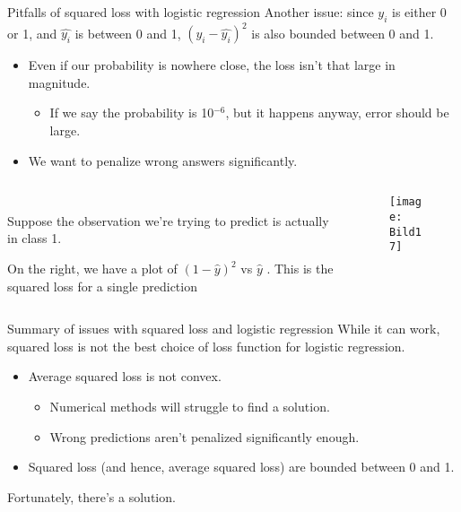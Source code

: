 \documentclass[aspectratio=169]{../latex_main/tntbeamer}  %
\begin{document}
	
	\begin{frame}{Pitfalls of squared loss with logistic regression}
        Another issue: since  $y_i$     is either 0 or 1, and   $\hat{y_i}$    is between 0 and 1,          $(y_i - \hat{y_i})^2$            is also bounded between 0 and 1.
        \begin{itemize}
            \item Even if our probability is nowhere close, the loss isn’t that large in magnitude.
            \begin{itemize}
                \item If we say the probability is 10$^{-6}$, but it happens anyway, error should be large.
            \end{itemize}
            \item We want to penalize wrong answers significantly.
        \end{itemize}
	    \begin{columns}
	        \begin{column}{.5\textwidth}
	                \\ \bigskip
	               Suppose the observation we're trying to predict is actually in class 1. \\
	               \bigskip
	               
	                On the right, we have a plot of     $(1 - \hat{y})^2$            vs $\hat{y}$      . This is the squared loss for a single prediction
	        \end{column}
	        
	        \begin{column}{.5\textwidth}
	                \begin{figure}
	                    \centering
	                    \texttt{[image: Bild17]}
	                \end{figure}
	        \end{column}
	    \end{columns}
	\end{frame}
	
	\begin{frame}{Summary of issues with squared loss and logistic regression}
	    While it can work, squared loss is not the best choice of loss function for logistic regression.
	    \begin{itemize}
	        \item Average squared loss is not convex.
	        \begin{itemize}
	            \item Numerical methods will struggle to find a solution.
	        \end{itemize}
	        \begin{itemize}
	            \item Wrong predictions aren’t penalized significantly enough.
	        \end{itemize}
	        \item Squared loss (and hence, average squared loss) are bounded between 0 and 1.
	    \end{itemize}
	    
	    \bigskip
	    Fortunately, there’s a solution.
	\end{frame}
\end{document}
